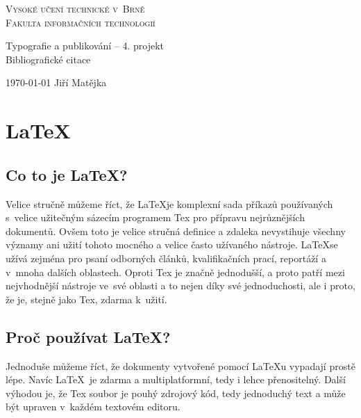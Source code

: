 \documentclass[11pt,a4paper,titlepage]{article}
\begin{document}
\thispagestyle{empty}
\begin{center}

\textsc{
\Huge{Vysoké učení technické v~Brně \\}
\huge{Fakulta informačních technologií\\}
}


\LARGE{Typografie a publikování -- 4. projekt \\}
\Huge{Bibliografické citace\\}

\end{center}

\Large{\today} \hfill Jiří Matějka

\newpage
\setcounter{page}{1}
\section{\LaTeX}
\subsection{Co to je \LaTeX ?} 
Velice stručně můžeme říct, že
\LaTeX je komplexní sada příkazů používaných s~velice užitečným sázecím programem Tex pro přípravu nejrůznějších dokumentů.
\cite{book:guide-to-latex}
Ovšem toto je velice stručná definice a zdaleka nevystihuje všechny významy
ani užití tohoto mocného a velice často užívaného nástroje.
\LaTeX se užívá zejména pro psaní odborných článků, kvalifikačních prací, reportáží a v~mnoha dalších oblastech.
Oproti Tex je značně jednodušší, a proto patří mezi nejvhodnější nástroje ve~své
oblasti a to nejen díky své jednoduchosti, ale i proto, že je, stejně jako Tex,
zdarma k~užití.

\subsection{Proč používat \LaTeX ?}
Jednoduše můžeme říct, že dokumenty vytvořené pomocí \LaTeX u vypadají prostě lépe.
Navíc \LaTeX~je zdarma a multiplatformní, tedy i lehce přenositelný. Další výhodou je, že Tex
soubor je pouhý zdrojový kód, tedy jednoduchý text a může být upraven v~každém
textovém editoru.\cite{web:why-use-latex}
\end{document}
